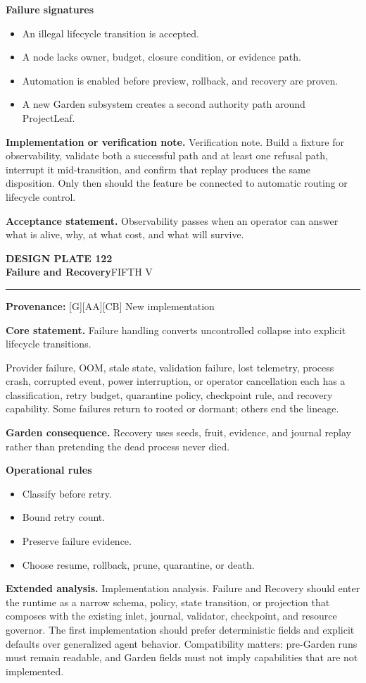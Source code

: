 \documentclass[10pt,letterpaper,oneside]{article}
\newcommand{\prov}[1]{\textcolor{gardenBlue}{\sffamily\footnotesize\textbf{Provenance:} #1}}
\newcommand{\platetitle}[3]{%
  \begin{minipage}[t][0.54in][t]{\textwidth}
  {\sffamily\bfseries\color{gardenDeep}\fontsize{9}{10}\selectfont DESIGN PLATE #1}\\[-1pt]
  {\sffamily\bfseries\color{gardenInk}\fontsize{16.5}{18}\selectfont #2}\hfill{\sffamily\color{gardenGreen}\large #3}
  \end{minipage}\vspace{-2pt}\hrule\vspace{5pt}}
\begin{document}
\textbf{Failure signatures}
\begin{itemize}
\item An illegal lifecycle transition is accepted.
\item A node lacks owner, budget, closure condition, or evidence path.
\item Automation is enabled before preview, rollback, and recovery are proven.
\item A new Garden subsystem creates a second authority path around ProjectLeaf.
\end{itemize}
\textbf{Implementation or verification note.} Verification note. Build a fixture for observability, validate both a successful path and at least one refusal path, interrupt it mid-transition, and confirm that replay produces the same disposition. Only then should the feature be connected to automatic routing or lifecycle control.

\begin{acceptbox}
\textbf{Acceptance statement.} Observability passes when an operator can answer what is alive, why, at what cost, and what will survive.
\end{acceptbox}
\newpage
\platetitle{122}{Failure and Recovery}{FIFTH V}
\prov{[G][AA][CB] New implementation}
\fontsize{8.85}{10.45}\selectfont
\begin{corebox}
\textbf{Core statement.} Failure handling converts uncontrolled collapse into explicit lifecycle transitions.
\end{corebox}
Provider failure, OOM, stale state, validation failure, lost telemetry, process crash, corrupted event, power interruption, or operator cancellation each has a classification, retry budget, quarantine policy, checkpoint rule, and recovery capability. Some failures return to rooted or dormant; others end the lineage.

\textbf{Garden consequence.} Recovery uses seeds, fruit, evidence, and journal replay rather than pretending the dead process never died.

\textbf{Operational rules}
\begin{itemize}
\item Classify before retry.
\item Bound retry count.
\item Preserve failure evidence.
\item Choose resume, rollback, prune, quarantine, or death.
\end{itemize}
\textbf{Extended analysis.} Implementation analysis. Failure and Recovery should enter the runtime as a narrow schema, policy, state transition, or projection that composes with the existing inlet, journal, validator, checkpoint, and resource governor. The first implementation should prefer deterministic fields and explicit defaults over generalized agent behavior. Compatibility matters: pre-Garden runs must remain readable, and Garden fields must not imply capabilities that are not implemented.
\end{document}
